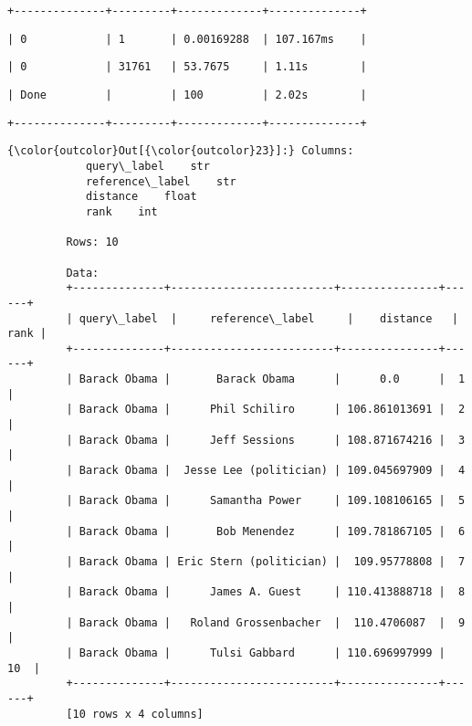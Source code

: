 \documentclass[11pt]{article}
\begin{document}
    \begin{verbatim}
+--------------+---------+-------------+--------------+
    \end{verbatim}

    
    
    \begin{verbatim}
| 0            | 1       | 0.00169288  | 107.167ms    |
    \end{verbatim}

    
    
    \begin{verbatim}
| 0            | 31761   | 53.7675     | 1.11s        |
    \end{verbatim}

    
    
    \begin{verbatim}
| Done         |         | 100         | 2.02s        |
    \end{verbatim}

    
    
    \begin{verbatim}
+--------------+---------+-------------+--------------+
    \end{verbatim}

    
\begin{Verbatim}[commandchars=\\\{\}]
{\color{outcolor}Out[{\color{outcolor}23}]:} Columns:
         	query\_label	str
         	reference\_label	str
         	distance	float
         	rank	int
         
         Rows: 10
         
         Data:
         +--------------+-------------------------+---------------+------+
         | query\_label  |     reference\_label     |    distance   | rank |
         +--------------+-------------------------+---------------+------+
         | Barack Obama |       Barack Obama      |      0.0      |  1   |
         | Barack Obama |      Phil Schiliro      | 106.861013691 |  2   |
         | Barack Obama |      Jeff Sessions      | 108.871674216 |  3   |
         | Barack Obama |  Jesse Lee (politician) | 109.045697909 |  4   |
         | Barack Obama |      Samantha Power     | 109.108106165 |  5   |
         | Barack Obama |       Bob Menendez      | 109.781867105 |  6   |
         | Barack Obama | Eric Stern (politician) |  109.95778808 |  7   |
         | Barack Obama |      James A. Guest     | 110.413888718 |  8   |
         | Barack Obama |   Roland Grossenbacher  |  110.4706087  |  9   |
         | Barack Obama |      Tulsi Gabbard      | 110.696997999 |  10  |
         +--------------+-------------------------+---------------+------+
         [10 rows x 4 columns]
\end{Verbatim}
            
\end{document}
